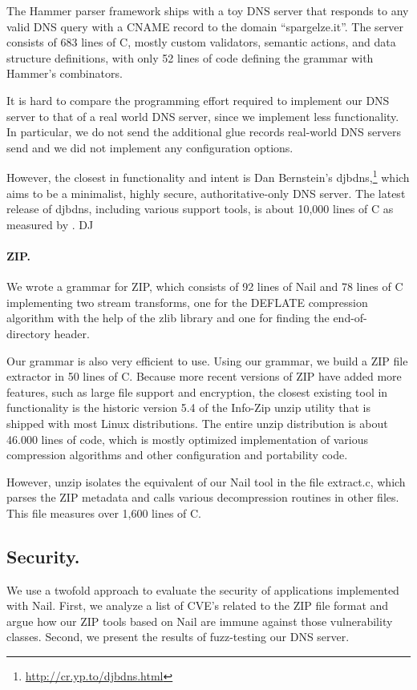 The Hammer parser framework\cite{hammer-parser} ships with a toy DNS server that responds to
any valid DNS query with a CNAME record to the domain ``spargelze.it''. 
The server consists of 683 lines of C, mostly custom validators, semantic actions,
and data structure definitions, with only 52 lines of code defining the
grammar with Hammer's combinators.

It is hard to compare the programming effort required to implement
our DNS server to that of a real world DNS server, since we implement less functionality.
 In particular, we do not send the additional glue records real-world DNS servers send and
we did not implement any configuration options.

However, the closest in functionality and intent is Dan Bernstein's
djbdns,\footnote{\url{http://cr.yp.to/djbdns.html}} which aims to be a minimalist, highly secure,
authoritative-only DNS server. The latest release of djbdns, including various support tools, is
about 10,000 lines of C as measured by . DJ

\paragraph{ZIP.}


We wrote a grammar for ZIP, which consists of 92 lines of Nail and 78 lines of C implementing two
stream transforms, one for the DEFLATE compression algorithm with the help of the zlib library and
one for finding the end-of-directory header. 

Our grammar is also very efficient to use. Using our grammar, we build a ZIP file extractor in 50
lines of C. Because more recent versions of ZIP have added more features, such as large file support
and encryption, the closest existing tool in functionality is the historic version 5.4 of the Info-Zip unzip
utility\cite{infozip} that is shipped with most Linux distributions. The entire unzip distribution
is about 46.000 lines of code, which is mostly optimized implementation of various compression
algorithms and other configuration and portability code.

However, unzip isolates the equivalent of our Nail tool in the file extract.c, which parses the ZIP
metadata and calls various decompression routines in other files. This file measures over 1,600
lines of C. 

\subsection{Security.} 
We use a twofold approach to evaluate the security of applications implemented with Nail. First, we
analyze a list of CVE's related to the ZIP file format and argue how our ZIP tools based on Nail are
immune against those vulnerability classes. Second, we present the results of fuzz-testing our DNS
server.

